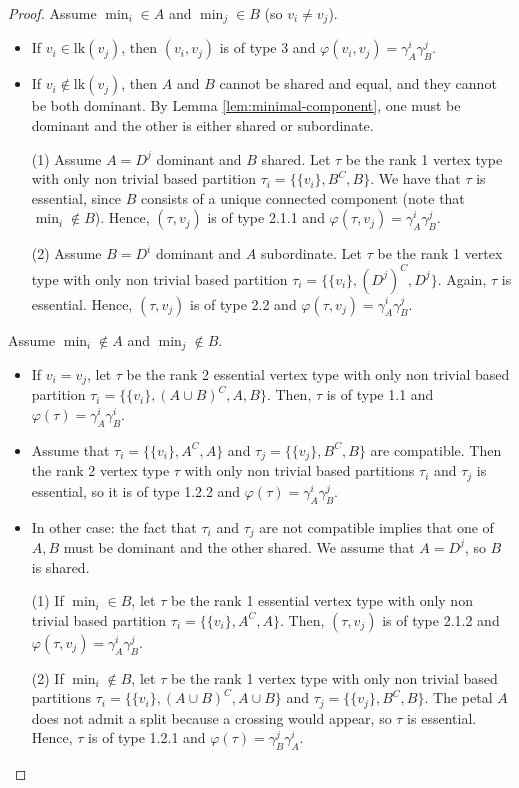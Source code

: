 \documentclass[10pt,a4paper]{amsart}
\newcommand{\lk}{\mathrm{lk}}
\begin{document}
\begin{proof}
 Assume $\min_i\in A$ and $\min_j\in B$ (so $v_i\neq v_j$).
\begin{itemize}
    \item If $v_i\in\lk(v_j)$, then $(v_i,v_j)$ is of type 3 and $\varphi(v_i,v_j)=\gamma^i_{A}\gamma^j_{B}$.
    \item If $v_i\notin\lk(v_j)$, then $A$ and $B$ cannot be shared and equal, and they cannot be both dominant. By Lemma \ref{lem:minimal-component}, one must be dominant and the other is either shared or subordinate.

    (1) Assume $A=D^j$ dominant and $B$ shared. Let $\tau$ be the rank 1 vertex type with only non trivial based partition  $\tau_i=\{\{v_i\}, B^C, B\}$. We have that $\tau$ is essential, since $B$ consists of a unique connected component (note that $\min_i\notin B$). Hence, $(\tau,v_j)$ is of type 2.1.1 and $\varphi(\tau,v_j)=\gamma^i_{A}\gamma^j_{B}$.

    (2) Assume $B=D^i$ dominant and $A$ subordinate. Let $\tau$ be the rank 1 vertex type with only non trivial based partition  $\tau_i=\{\{v_i\}, (D^j)^C, D^j\}$. Again, $\tau$ is essential. Hence, $(\tau,v_j)$ is of type 2.2 and $\varphi(\tau,v_j)=\gamma^i_{A}\gamma^j_{B}$.
\end{itemize}

 Assume $\min_i\notin A$ and $\min_j\notin B$.
\begin{itemize}
    \item If $v_i=v_j$, let  $\tau$ be the rank 2 essential vertex type with only non trivial based partition  $\tau_i=\{\{v_i\}, (A\cup B)^C, A, B\}$. Then, $\tau$ is of type 1.1 and $\varphi(\tau)=\gamma^i_{A}\gamma^i_{B}$.
    \item Assume that  $\tau_i=\{\{v_i\}, A^C, A\}$ and $\tau_j=\{\{v_j\}, B^C, B\}$ are compatible. Then the rank 2 vertex type $\tau$ with only non trivial based partitions  $\tau_i$ and $\tau_j$ is essential, so it is of type 1.2.2 and $\varphi(\tau)=\gamma^i_{A}\gamma^j_{B}$.
    \item In other case: the fact that $\tau_i$ and $\tau_j$ are not compatible implies that one of $A,B$  must be  dominant and the other shared. We assume that $A=D^j$, so $B$ is shared.

    (1) If  $\min_i\in B$, let $\tau$ be the rank 1 essential vertex type with only non trivial based partition  $\tau_i=\{\{v_i\}, A^C, A\}$. Then, $(\tau,v_j)$ is of type 2.1.2 and $\varphi(\tau,v_j)=\gamma^i_{A}\gamma^j_{B}$.

    

    (2) If  $\min_i\notin B$, let $\tau$ be the rank 1 vertex type with only non trivial based partitions $\tau_i=\{\{v_i\}, (A\cup B)^C, A\cup B\}$ and $\tau_j=\{\{v_j\}, B^C,  B\}$. The petal $A$  does not admit a split because a crossing would appear, so $\tau$ is essential. Hence, $\tau$ is of type 1.2.1 and $\varphi(\tau)=\gamma^j_{B}\gamma^i_{A}$.

\end{itemize}







\end{proof}
\end{document}
